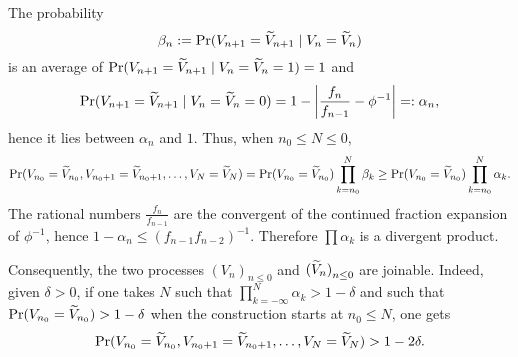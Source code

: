 \documentclass[12pt,a4paper]{article}
\begin{document}
The probability 
$$
\beta_n:=\Pr(V_{n+1} = \widetilde{V}_{n+1} \mid V_{n}=\widetilde{V}_{n})
$$
is an average of 
$\Pr(V_{n+1} = \widetilde{V}_{n+1} \mid V_{n}=\widetilde{V}_{n}=1)  = 1$ and 
$$
\Pr(V_{n+1} = \widetilde{V}_{n+1} \mid V_{n}=\widetilde{V}_{n}=0) 
= 1 - \left|\frac{f_n}{f_{n-1}} - \phi^{-1}\right| =: \alpha_n, 
$$
hence it lies between $\alpha_n$ and $1$. 
Thus, when $n_0 \leq N \leq 0$, 
$$
\Pr(V_{n_0} = \widetilde{V}_{n_0}, V_{n_0+1} = \widetilde{V}_{n_0+1}, \ldots, V_{N} = \widetilde{V}_{N}) = 
\Pr(V_{n_0} = \widetilde{V}_{n_0}) \prod_{k={n_0}}^N \beta_k 
\geq \Pr(V_{n_0} = \widetilde{V}_{n_0}) \prod_{k={n_0}}^N \alpha_k.
$$
The rational numbers $\frac{f_n}{f_{n-1}}$ are the convergent of the continued fraction 
expansion of $\phi^{-1}$, hence $1 - \alpha_n \leq {(f_{n-1}f_{n-2})}^{-1}$. 
Therefore $\prod \alpha_k$ is a divergent product.

Consequently, the two processes ${(V_n)}_{n \leq 0}$ and ${(\widetilde{V}_n)}_{n \leq 0}$ 
are joinable. Indeed, given $\delta>0$, if one takes $N$ such that 
$\prod_{k={-\infty}}^N \alpha_k > 1 - \delta$ and such that 
$\Pr(V_{n_0} = \widetilde{V}_{n_0}) > 1-\delta$ when the construction starts at 
$n_0 \leq N$, one gets 
$$
\Pr(V_{n_0} = \widetilde{V}_{n_0}, V_{n_0+1} = \widetilde{V}_{n_0+1}, \ldots, V_{N} = \widetilde{V}_{N}) > 1-2\delta.
$$
\end{document}

